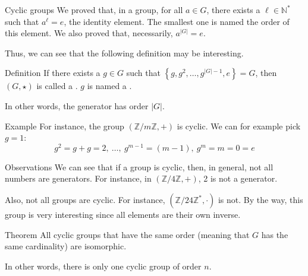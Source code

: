 \documentclass[a4paper]{article}
\begin{document}
\begin{parag}{Cyclic groups}
    We proved that, in a group, for all $a \in G$, there exists a $\ell \in \mathbb{N}^*$ such that $a^\ell = e$, the identity element. The smallest one is named the order of this element. We also proved that, necessarily, $a^{\left|G\right|} = e$.
    
    Thus, we can see that the following definition may be interesting.

    \begin{subparag}{Definition}
        If there exists a $g \in G$  such that $\left\{g, g^2, \ldots, g^{\left|G\right| - 1}, e\right\} = G$, then $\left(G, \star\right)$ is called a . $g$ is named a .

        In other words, the generator has order $\left|G\right|$.
    \end{subparag}

    \begin{subparag}{Example}
        For instance, the group $\left(\mathbb{Z} / m\mathbb{Z}, +\right)$ is cyclic. We can for example pick $g = 1$: 
        \[g^2 = g + g = 2,\ \ldots,\ g^{m-1} = \left(m-1\right),\ g^m = m = 0 = e\]
    \end{subparag}
    
    \begin{subparag}{Observations}
        We can see that if a group is cyclic, then, in general, not all numbers are generators. For instance, in $\left(\mathbb{Z} / 4\mathbb{Z}, +\right)$, 2 is not a generator.

        Also, not all groups are cyclic. For instance, $\left(\mathbb{Z} / 24 \mathbb{Z}^*, \cdot\right)$ is not. By the way, this group is very interesting since all elements are their own inverse.
    \end{subparag}
    

    \begin{subparag}{Theorem}
        All cyclic groups that have the same order (meaning that $G$ has the same cardinality) are isomorphic. 

        In other words, there is only one cyclic group of order $n$.
    \end{subparag}
\end{parag}
\end{document}

